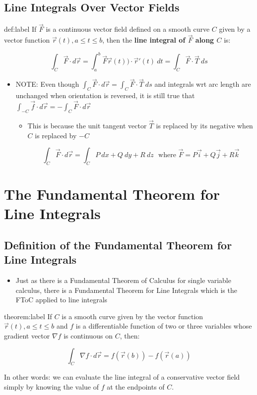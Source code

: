 \documentclass{package/notes}
\begin{document}
\subsection{Line Integrals Over Vector Fields}

\begin{definition}{def:label}
	If $\vec F$ is a continuous vector field defined on a smooth curve $C$ given by a vector function $\vec r(t), a \le t \le b$, then the \textbf{line integral of $\vec F$ along $C$} is:

	$$\int_C\vec F\cdot d\vec r = \int_a^b\vec F\vec r(t)) \cdot \vec r'(t)\:dt=\int_C\vec F \cdot \vec T \:ds$$
\end{definition}

\begin{itemize}
	\item NOTE: Even though $\int_C \vec F \cdot d\vec r= \int_C \vec F \cdot \vec T \: ds$ and integrals wrt arc length are unchanged when orientation is reversed, it is still true that $\int_{-C}\vec f \cdot d\vec r = -\int_C\vec F \cdot d\vec r$
	\begin{itemize}
		\item This is because the unit tangent vector $\vec T$ is replaced by its negative when $C$ is replaced by $-C$
		
		$$\int_C \vec F \cdot d\vec r = \int_C P\:dx + Q\:dy + R\:dz\:\:\:
		\text{where } \vec F = P\vec i + Q\vec j + R\vec k$$
	\end{itemize}
\end{itemize}



\section{The Fundamental Theorem for Line Integrals}


\subsection{Definition of the Fundamental Theorem for Line Integrals}

\begin{itemize}
	\item Just as there is a Fundamental Theorem of Calculus for single variable calculus, there is a Fundamental Theorem for Line Integrals which is the FToC applied to line integrals
\end{itemize}

\begin{theorem}{theorem:label}
	If $C$ is a smooth curve given by the vector function $\vec r(t), a\le t\le b$ and $f$ is a differentiable  function of two or three variables whose gradient vector $\nabla f$ is continuous on $C$, then:

	$$\int_C\nabla f\cdot d\vec r = f(\vec r(b)) - f(\vec r(a))$$

	In other words: we can evaluate the line integral of a conservative vector field simply by knowing the value of $f$ at the endpoints of $C$.
\end{theorem}
\end{document}
